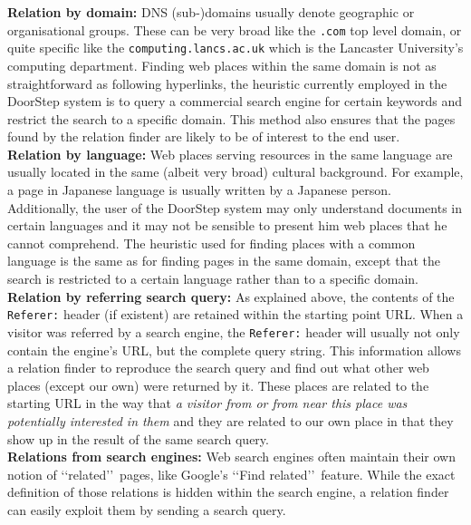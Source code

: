 \documentclass[a4paper]{danarticle}
\theoremstyle{remark}
\begin{document}
    \textbf{Relation by domain:} DNS (sub-)domains usually denote geographic or 
    organisational groups. These can be very broad like the \verb$.com$ top 
    level domain, or quite specific like the \verb$computing.lancs.ac.uk$ 
    which is the Lancaster University's computing department. 
    Finding web places within the same domain is not as 
    straightforward as following hyperlinks, the heuristic currently employed 
    in the DoorStep system is to query a commercial search engine for certain 
    keywords and restrict the search to a specific domain. This method also 
    ensures that the pages found by the relation finder are likely to be 
    of interest to the end user.
    \\
    
    \textbf{Relation by language:} Web places serving resources in the same 
    language are usually located in the same (albeit very broad) cultural background. 
    For example, a page in Japanese language is usually written by a Japanese 
    person. Additionally, the user of the DoorStep system may only understand 
    documents in certain languages and it may not be sensible to present him web 
    places that he cannot comprehend. The heuristic used for finding places with 
    a common language is the same as for finding pages in the same domain,
    except that the search is restricted to a certain language rather than to a
    specific domain.
    \\
    
    \textbf{Relation by referring search query:} As explained above, the 
    contents of the \verb$Referer:$ header (if existent) are retained within the 
    starting point URL. When a visitor was referred by a search 
    engine, the \verb$Referer:$ header will usually not only contain the 
    engine's URL, but the complete query string. This information allows a 
    relation finder to reproduce the search query and find out what other web 
    places (except our own) were returned by it. These places are related to the 
    starting URL in the way that \textit{a visitor from or from near this place was 
    potentially interested in them} and they are related to our own place in
    that they show up in the result of the same search query.
    \\
    
    \textbf{Relations from search engines:} Web search engines often maintain 
    their own notion of \lq\lq related\rq\rq\ pages, like Google's 
    \lq\lq Find related\rq\rq\ feature. While the exact definition of those 
    relations is hidden within the search engine, a relation finder can 
    easily exploit them by sending a search query.
    \\
    
\end{document}
